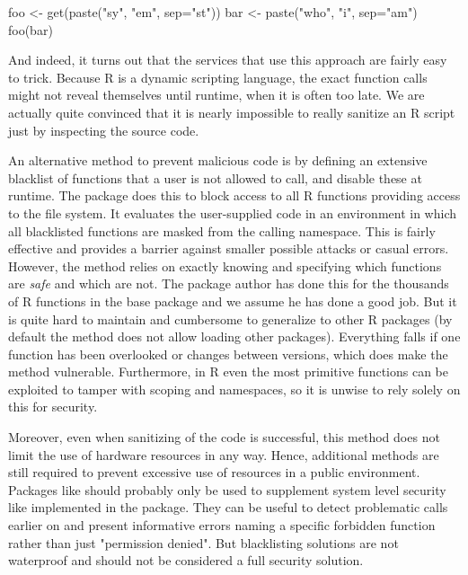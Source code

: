 \documentclass{jss}
\newcommand{\R}{\textsf{R}\xspace}
\newcommand{\RAppArmor}{\pkg{RAppArmor}\xspace}
\begin{document}
\begin{CodeChunk}
\begin{CodeInput}
foo <- get(paste("sy", "em", sep="st"))
bar <- paste("who", "i", sep="am")
foo(bar)
\end{CodeInput}
\end{CodeChunk}

And indeed, it turns out that the services that use this approach are fairly
easy to trick. Because \R is a dynamic scripting language, the exact
function calls might not reveal themselves until runtime, when it is often too
late. We are actually quite convinced that it is nearly impossible to really
sanitize an \R script just by inspecting the source code.

An alternative method to prevent malicious code is by defining an extensive blacklist of
functions that a user is not allowed to call, and disable these at runtime. The
 package \citep{sandboxR}  does this to block access
to all \R functions providing access to the file system. It evaluates
the user-supplied code in an environment in which all blacklisted functions are
masked from the calling namespace. This is fairly effective and provides a barrier against smaller possible attacks or casual errors. However, the method relies on exactly knowing and
specifying which functions are \emph{safe} and which are not. The package
author has done this for the thousands of \R functions in the base package and
we assume he has done a good job. But it is quite hard to maintain and
cumbersome to generalize to other \R packages (by default the
method does not allow loading other packages). Everything
falls if one function has been overlooked or changes between
versions, which does make the method vulnerable. Furthermore, in \R even the most primitive functions can be exploited to tamper with scoping and namespaces,
so it is unwise to rely solely on this for security. 

Moreover, even when sanitizing of the code is successful, this method does not
limit the use of hardware resources in any way. Hence, additional methods are
still required to prevent excessive use of resources in a public environment.
Packages like  should probably only be used to supplement system
level security like implemented in the \RAppArmor package.
They can be useful to detect problematic calls earlier on and present informative errors naming a specific forbidden function rather than just "permission denied".
But blacklisting solutions are not waterproof and should not be considered a full
security solution.
\end{document}
